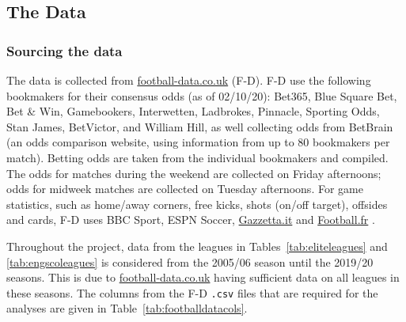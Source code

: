 \documentclass[a4paper,10pt]{report}
\begin{document}
\subsection{The Data} \label{ssec:data}
\subsubsection{Sourcing the data}
The data is collected from \url{football-data.co.uk} (F-D). F-D use the following bookmakers for their consensus odds (as of 02/10/20): Bet365, Blue Square Bet, Bet \& Win, Gamebookers, Interwetten, Ladbrokes, Pinnacle, Sporting Odds, Stan James, BetVictor, and William Hill, as well collecting odds from BetBrain (an odds comparison website, using information from up to 80 bookmakers per match). Betting odds are taken from the individual bookmakers and compiled. The odds for matches during the weekend are collected on Friday afternoons; odds for midweek matches are collected on Tuesday afternoons. For game statistics, such as home/away corners, free kicks, shots (on/off target), offsides and cards, F-D uses BBC Sport, ESPN Soccer, \url{Gazzetta.it} and \url{Football.fr} \autocite{FootballDataNotes}.

Throughout the project, data from the leagues in Tables~\ref{tab:eliteleagues} and \ref{tab:engscoleagues} is considered from the 2005/06 season until the 2019/20 seasons. This is due to \url{football-data.co.uk} having sufficient data on all leagues in these seasons. The columns from the F-D \lstinline|.csv| files that are required for the analyses are given in Table~\ref{tab:footballdatacols}.
\end{document}
